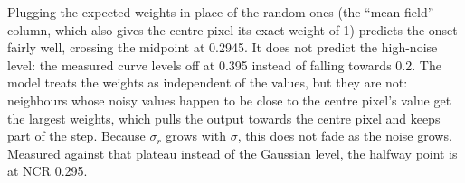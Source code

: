 Plugging the expected weights in place of the random ones (the ``mean-field''
column, which also gives the centre pixel its exact weight of 1) predicts the
onset fairly well, crossing the midpoint at 0.2945. It does not predict the
high-noise level: the measured curve levels off at 0.395 instead of falling
towards 0.2. The model treats the weights as independent of the values, but they
are not: neighbours whose noisy values happen to be close to the centre pixel's
value get the largest weights, which pulls the output towards the centre pixel
and keeps part of the step. Because $\sigma_r$ grows with $\sigma$, this does not
fade as the noise grows. Measured against that plateau instead of the Gaussian
level, the halfway point is at NCR 0.295.
